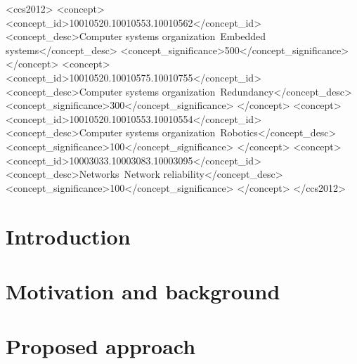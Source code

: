 \documentclass[sigconf]{acmart}
\begin{document}
\begin{CCSXML}
<ccs2012>
 <concept>
  <concept_id>10010520.10010553.10010562</concept_id>
  <concept_desc>Computer systems organization~Embedded systems</concept_desc>
  <concept_significance>500</concept_significance>
 </concept>
 <concept>
  <concept_id>10010520.10010575.10010755</concept_id>
  <concept_desc>Computer systems organization~Redundancy</concept_desc>
  <concept_significance>300</concept_significance>
 </concept>
 <concept>
  <concept_id>10010520.10010553.10010554</concept_id>
  <concept_desc>Computer systems organization~Robotics</concept_desc>
  <concept_significance>100</concept_significance>
 </concept>
 <concept>
  <concept_id>10003033.10003083.10003095</concept_id>
  <concept_desc>Networks~Network reliability</concept_desc>
  <concept_significance>100</concept_significance>
 </concept>
</ccs2012>
\end{CCSXML}



\maketitle
	\section{Introduction}
\label{sec:Introduction}



\section{Motivation and background}
\label{sec:Background}







\section{Proposed approach}
\label{sec:ProposedApproach}

\end{document}
